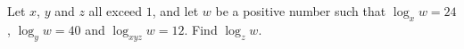 Let $x$, $y$ and $z$ all exceed $1$, and let $w$ be a positive number such that $\log_xw=24$, $\log_yw=40$ and $\log_{xyz}w=12$. Find $\log_zw$.
